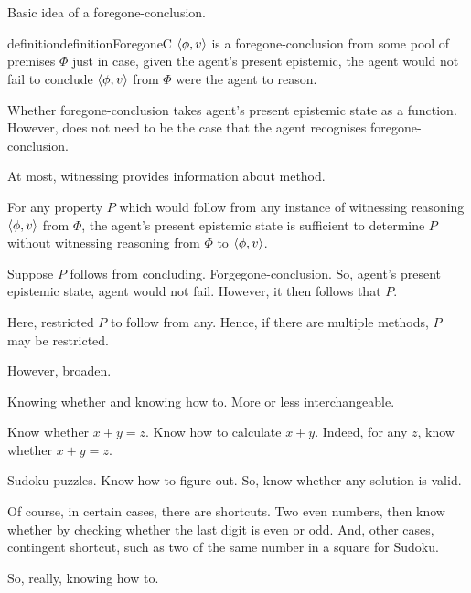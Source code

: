 \chapter{}
\label{cha:foregone-conclusions}

\begin{note}
  Basic idea of a foregone-conclusion.

  \begin{restatable}{definition}{definitionForegoneC}
    \(\langle \phi, v \rangle\) is a foregone-conclusion from some pool of premises \(\Phi\) just in case, given the agent's present epistemic, the agent would not fail to conclude \(\langle \phi, v \rangle\) from \(\Phi\) were the agent to reason.
  \end{restatable}

  Whether foregone-conclusion takes agent's present epistemic state as a function.
  However, does not need to be the case that the agent recognises foregone-conclusion.

  At most, witnessing provides information about method.

  For any property \(P\) which would follow from any instance of witnessing reasoning \(\langle \phi, v \rangle\) from \(\Phi\), the agent's present epistemic state is sufficient to determine \(P\) without witnessing reasoning from \(\Phi\) to \(\langle \phi, v \rangle\).

  Suppose \(P\) follows from concluding.
  Forgegone-conclusion.
  So, agent's present epistemic state, agent would not fail.
  However, it then follows that \(P\).

  Here, restricted \(P\) to follow from any.
  Hence, if there are multiple methods, \(P\) may be restricted.

  However, broaden.
\end{note}

\begin{note}
  Knowing whether and knowing how to.
  More or less interchangeable.

  Know whether \(x + y = z\).
  Know how to calculate \(x + y\).
  Indeed, for any \(z\), know whether \(x + y = z\).

  Sudoku puzzles.
  Know how to figure out.
  So, know whether any solution is valid.

  Of course, in certain cases, there are shortcuts.
  Two even numbers, then know whether by checking whether the last digit is even or odd.
  And, other cases, contingent shortcut, such as two of the same number in a square for Sudoku.

  So, really, knowing how to.
\end{note}

